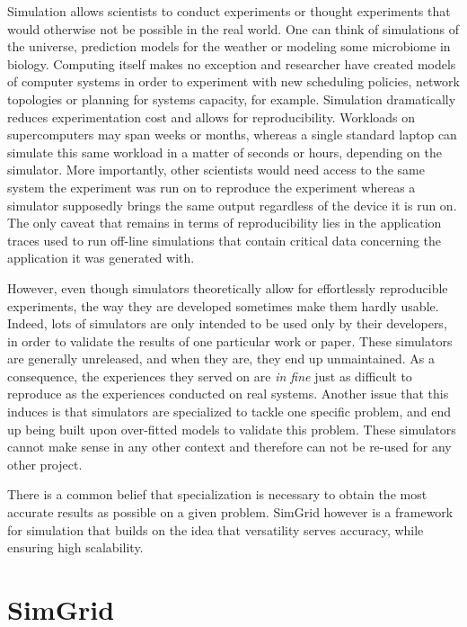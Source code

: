 Simulation allows scientists to conduct experiments or thought experiments that
would otherwise not be possible in the real world. One can think of simulations
of the universe, prediction models for the weather or modeling some microbiome
in biology. Computing itself makes no exception and researcher have created
models of computer systems in order to experiment with new scheduling policies,
network topologies or planning for systems capacity, for example. Simulation
dramatically reduces experimentation cost and allows for reproducibility.
Workloads on supercomputers may span weeks or months, whereas a single standard
laptop can simulate this same workload in a matter of seconds or hours,
depending on the simulator. More importantly, other scientists would need
access to the same system the experiment was run on to reproduce the experiment
whereas a simulator supposedly brings the same output regardless of the device
it is run on. The only caveat that remains in terms of reproducibility lies in
the application traces used to run off-line simulations that contain critical
data concerning the application it was generated with.

However, even though simulators theoretically allow for effortlessly
reproducible experiments, the way they are developed sometimes make them hardly
usable. Indeed, lots of simulators are only intended to be used only by their
developers, in order to validate the results of one particular work or paper.
These simulators are generally unreleased, and when they are, they end up
unmaintained. As a consequence, the experiences they served on are \textit{in
fine} just as difficult to reproduce as the experiences conducted on real
systems.
Another issue that this induces is that simulators are specialized to tackle
one specific problem, and end up being built upon over-fitted models to
validate this problem. These simulators cannot make sense in any other context
and therefore can not be re-used for any other project.

There is a common belief that specialization is necessary to obtain the most
accurate results as possible on a given problem.
SimGrid\cite{casanova:hal-01017319} however is a framework for simulation that
builds on the idea that versatility serves accuracy, while ensuring high
scalability.

\section{SimGrid}

